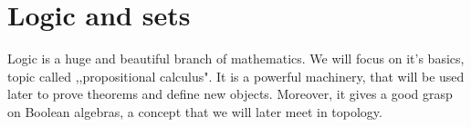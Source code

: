 
\chapter{Logic and sets}
\label{logic_and_sets}

Logic is a huge and beautiful branch of mathematics. We will focus on it's basics, topic called ,,propositional calculus". It is a powerful machinery, that will be used later
to prove theorems and define new objects. Moreover, it gives a good grasp on Boolean algebras, a concept that we will later meet in topology.






% 


% 
